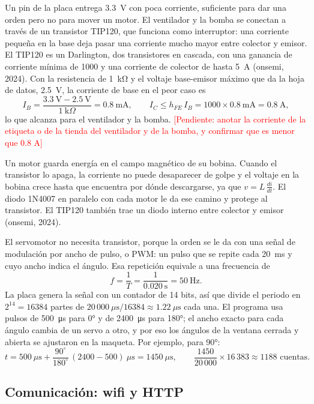 \documentclass[12pt, letterpaper]{article}
\newcommand{\pendiente}[1]{\textcolor{red}{[Pendiente: #1]}}
\begin{document}
Un pin de la placa entrega \SI{3.3}{\volt} con poca corriente, suficiente para dar una orden pero no para mover un
motor. El ventilador y la bomba se conectan a través de un transistor TIP120, que funciona como interruptor: una
corriente pequeña en la base deja pasar una corriente mucho mayor entre colector y emisor. El TIP120 es un Darlington,
dos transistores en cascada, con una ganancia de corriente mínima de 1000 y una corriente de colector de hasta
\SI{5}{\ampere} (onsemi, 2024). Con la resistencia de \SI{1}{\kilo\ohm} y el voltaje base-emisor máximo que da la hoja
de datos, \SI{2.5}{\volt}, la corriente de base en el peor caso es
\[
I_B = \frac{3.3\ \text{V} - 2.5\ \text{V}}{1\ \text{k}\Omega} = 0.8\ \text{mA},
\qquad I_C \leq h_{FE}\, I_B = 1000 \times 0.8\ \text{mA} = 0.8\ \text{A},
\]
lo que alcanza para el ventilador y la bomba.
\pendiente{anotar la corriente de la etiqueta o de la tienda del ventilador y de la bomba, y confirmar que es menor que 0.8 A}

Un motor guarda energía en el campo magnético de su bobina. Cuando el transistor lo apaga, la corriente no puede
desaparecer de golpe y el voltaje en la bobina crece hasta que encuentra por dónde descargarse, ya que
$v = L\,\frac{di}{dt}$. El diodo 1N4007 en paralelo con cada motor le da ese camino y protege al transistor. El TIP120
también trae un diodo interno entre colector y emisor (onsemi, 2024).

El servomotor no necesita transistor, porque la orden se le da con una señal de modulación por ancho de pulso, o PWM:
un pulso que se repite cada \SI{20}{\milli\second} y cuyo ancho indica el ángulo. Esa repetición equivale a una
frecuencia de
\[
f = \frac{1}{T} = \frac{1}{0.020\ \text{s}} = 50\ \text{Hz}.
\]
La placa genera la señal con un contador de 14 bits, así que divide el periodo en $2^{14} = 16384$ partes de
$20\,000\ \mu\text{s} / 16384 \approx 1.22\ \mu\text{s}$ cada una. El programa usa pulsos de \SI{500}{\micro\second}
para \ang{0} y de \SI{2400}{\micro\second} para \ang{180}; el ancho exacto para cada ángulo cambia de un servo a otro,
y por eso los ángulos de la ventana cerrada y abierta se ajustaron en la maqueta. Por ejemplo, para \ang{90}:
\[
t = 500\ \mu\text{s} + \frac{90^\circ}{180^\circ}\,(2400 - 500)\ \mu\text{s} = 1450\ \mu\text{s},
\qquad \frac{1450}{20\,000} \times 16\,383 \approx 1188 \text{ cuentas.}
\]

\subsection{Comunicación: wifi y HTTP}
\end{document}
